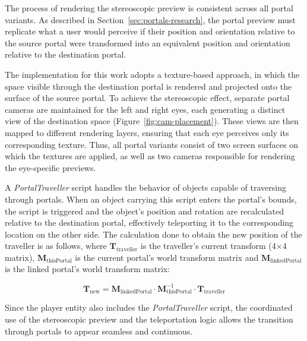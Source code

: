 The process of rendering the stereoscopic preview is consistent across all portal variants. As described in Section~\ref{sec:portals-research}, 
the portal preview must replicate what a user would perceive if their position and orientation relative to the source portal were transformed 
into an equivalent position and orientation relative to the destination portal.

The implementation for this work adopts a texture-based approach, in which the space visible through the destination portal is rendered and projected onto 
the surface of the source portal. To achieve the stereoscopic effect, separate portal cameras are maintained for the left and right eyes, 
each generating a distinct view of the destination space (Figure~\ref{fig:cam-placement}). These views are then mapped to different rendering 
layers, ensuring that each eye perceives only its corresponding texture. Thus, all portal variants consist of two screen surfaces on which the 
textures are applied, as well as two cameras responsible for rendering the eye-specific previews. 

A \textit{PortalTraveller} script handles the behavior of objects capable of traversing through portals. 
When an object carrying this script enters the portal's bounds, the script is triggered and the object's
position and rotation are recalculated relative to the destination portal, effectively teleporting it to the corresponding 
location on the other side. The calculation done to obtain the new position of the traveller is as follows, where 
$\mathbf{T}_{\text{traveller}}$ is the traveller's current transform (4×4 matrix), $\mathbf{M}_{\text{thisPortal}}$ is the current portal's world transform matrix 
and $\mathbf{M}_{\text{linkedPortal}}$ is the linked portal's world transform matrix:

\[
\mathbf{T}_{\text{new}} = \mathbf{M}_{\text{linkedPortal}} \cdot 
                           \mathbf{M}_{\text{thisPortal}}^{-1} \cdot 
                           \mathbf{T}_{\text{traveller}}
\]

Since the player entity also includes the \textit{PortalTraveller} script, the coordinated use of the stereoscopic 
preview and the teleportation logic allows the transition through portals to appear seamless and continuous.

